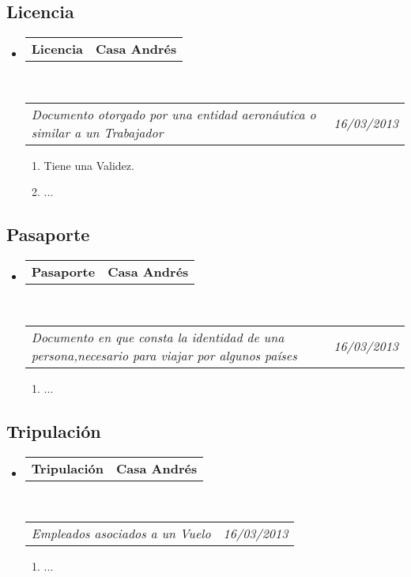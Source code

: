 \documentclass[10pt,letterpaper]{article}
\makeatletter
\newcommand{\headerrow}[2]
{\begin{tabular*}{\linewidth}{l@{\extracolsep{\fill}}r}
	#1 &
	#2 \\
\end{tabular*}}
\makeatother
\begin{document}
\subsection*{Licencia}

\begin{itemize}
	\parskip=0.1em

	\item
	\headerrow
		{\textbf{Licencia}}
		{\textbf{Casa Andrés}}
	\\
	\headerrow
		{\emph{Documento otorgado por una entidad aeronáutica o similar a un Trabajador}}
		{\emph{16/03/2013}}
	\begin{enumerate}
		\item Tiene una Validez.
		\item ...
	\end{enumerate}

\end{itemize}


\subsection*{Pasaporte}

\begin{itemize}
	\parskip=0.1em

	\item
	\headerrow
		{\textbf{Pasaporte}}
		{\textbf{Casa Andrés}}
	\\
	\headerrow
		{\emph{Documento en que consta la identidad de una persona,necesario para viajar por algunos países}}
		{\emph{16/03/2013}}
	\begin{enumerate}
		\item ...
	\end{enumerate}

\end{itemize}

\subsection*{Tripulación}

\begin{itemize}
	\parskip=0.1em

	\item
	\headerrow
		{\textbf{Tripulación}}
		{\textbf{Casa Andrés}}
	\\
	\headerrow
		{\emph{Empleados asociados a un Vuelo}}
		{\emph{16/03/2013}}
	\begin{enumerate}
		\item ...
	\end{enumerate}

\end{itemize}
\end{document}
